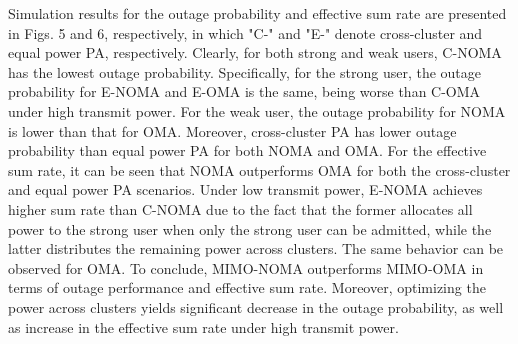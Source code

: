 \documentclass[10pt,final,journal,a4paper,twoside,twocolumn,romanappendices]{IEEEtran}
\theoremstyle{myremark}
\theoremstyle{myremark}
\begin{document}
{Simulation results for the outage probability and effective sum rate are presented in Figs. 5 and 6, respectively, in which "C-" and "E-" denote cross-cluster and equal power PA, respectively. Clearly, for both strong and weak users, C-NOMA has the lowest outage probability. Specifically, for the strong user, the outage probability for E-NOMA and E-OMA is the same, being worse than C-OMA under high transmit power. For the weak user, the outage probability for NOMA is lower than that for OMA. Moreover, cross-cluster PA has lower outage probability than equal power PA for both NOMA and OMA. For the effective sum rate, it can be seen that NOMA outperforms OMA for both the cross-cluster and equal power PA scenarios. Under low transmit power, E-NOMA achieves higher sum rate than C-NOMA due to the fact that the former allocates all power to the strong user when only the strong user can be admitted, while the latter distributes the remaining power across clusters. The same behavior can be observed for OMA. To conclude, MIMO-NOMA outperforms MIMO-OMA in terms of outage performance and effective sum rate. Moreover, optimizing the power across clusters yields significant decrease in the outage probability, as well as increase in the effective sum rate under high transmit power.  
}  
\end{document}
